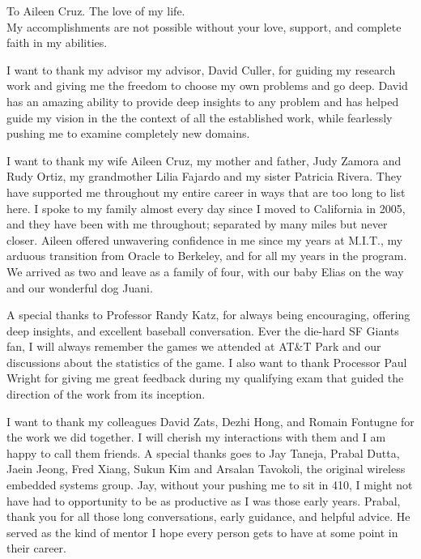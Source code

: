 \documentclass{ucbthesis}
\begin{document}
\begin{frontmatter}

\begin{dedication}
\null\vfil
\begin{center}
To Aileen Cruz.  The love of my life.\\\vspace{12pt}
My accomplishments are not possible without your love, support, and complete faith in my abilities.
\end{center}
\vfil\null
\end{dedication}

\tableofcontents
\clearpage
\listoffigures
\clearpage
\listoftables

\begin{acknowledgements}
I want to thank my advisor my advisor, David Culler, for guiding my research work and giving me the
freedom to choose my own problems and go deep.  David has an amazing ability to provide  
deep insights to any problem and has helped guide my vision in 
the the context of all the established work, while fearlessly pushing me to examine completely new domains.

I want to thank my wife Aileen Cruz, my mother and father, Judy Zamora and Rudy Ortiz, my 
grandmother Lilia Fajardo and my sister Patricia Rivera.  They have supported me throughout my entire career in ways
that are too long to list here. I spoke to my family almost every day since I moved to California in 2005, and they
have been with me throughout; separated by many miles but never closer.  Aileen offered unwavering confidence in me since 
my years at M.I.T., my arduous transition from Oracle to Berkeley, 
and for all my years in the program.  We arrived as two and leave as a family of four, with our baby Elias on the way and 
our wonderful dog Juani.  

A special thanks to Professor Randy Katz, for always being encouraging, offering deep insights, and 
excellent baseball conversation.  Ever the die-hard SF Giants fan, I will always remember the games we attended
at AT\&T Park and our discussions about the statistics of the game.
I also want to thank Processor Paul Wright for giving me great feedback during my qualifying exam that guided the direction
of the work from its inception.

I want to thank my colleagues David Zats, Dezhi Hong, and Romain Fontugne for the work we did together.  I will cherish my 
interactions with them and I am
happy to call them friends.  A special thanks goes to Jay Taneja, Prabal Dutta, Jaein Jeong, Fred Xiang, Sukun Kim and Arsalan 
Tavokoli, the original wireless
embedded systems group.  Jay, without your pushing me to sit in 410, I might not have had to opportunity to be 
as productive as I was those early years.  Prabal, thank you for all those long conversations, early guidance, and helpful advice.  
He served as the kind of
mentor I hope every person gets to have at some point in their career.


\end{acknowledgements}
\end{frontmatter}
\end{document}
